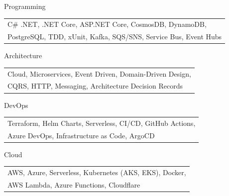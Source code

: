 


\begin{cvskills}
\vspace{0.45em}


\cvskill%
  {Programming} %
  {\begin{tabular}{@{}l@{}}
    C\# .NET, .NET Core, ASP.NET Core, CosmosDB, DynamoDB, \\ 
    PostgreSQL, TDD, xUnit, Kafka, SQS/SNS, Service Bus, Event Hubs
   \end{tabular}}

\vspace{0.45em}


\cvskill%
  {Architecture} %
  {\begin{tabular}{@{}l@{}}
    Cloud, Microservices, Event Driven, Domain-Driven Design, \\
    CQRS, HTTP, Messaging, Architecture Decision Records
   \end{tabular}} 

\vspace{0.45em}
  

\cvskill%
  {DevOps} %
  {\begin{tabular}{@{}l@{}}
    Terraform, Helm Charts, Serverless, CI/CD, GitHub Actions, \\ 
    Azure DevOps, Infrastructure as Code, ArgoCD
   \end{tabular}}


\cvskill%
  {Cloud} %
  {\begin{tabular}{@{}l@{}}
    AWS, Azure, Serverless, Kubernetes (AKS, EKS), Docker,\\
    AWS Lambda, Azure Functions, Cloudflare
   \end{tabular}}
  

\end{cvskills}